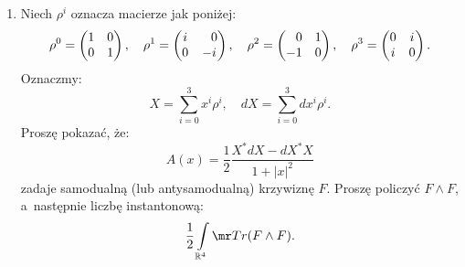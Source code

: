 \documentclass[a4paper,11pt]{article}
\begin{document}
\begin{enumerate}
\item Niech $\rho^{ i }$ oznacza macierze jak poniżej:
  \begin{equation}
    \label{eq:Superalgebra-05}
    \rho^{ 0 } =
    \begin{pmatrix}
      1 & 0 \\
      0 & 1
    \end{pmatrix}, \quad
    \rho^{ 1 } =
    \begin{pmatrix}
      i & \hphantom{-}0 \\
      0 & -i
    \end{pmatrix}, \quad
    \rho^{ 2 } =
    \begin{pmatrix}
      \hphantom{-}0 & 1 \\
      -1 & 0
    \end{pmatrix}, \quad
    \rho^{ 3 } =
    \begin{pmatrix}
      0 & i \\
      i & 0
    \end{pmatrix}.
  \end{equation}
  Oznaczmy:
  \begin{equation}
    \label{eq:Superalgebra-06}
    X = \sum_{ i = 0 }^{ 3 } x^{ i } \rho^{ i }, \quad
    dX = \sum_{ i = 0 }^{ 3 } dx^{ i } \rho^{ i }.
  \end{equation}
  Proszę pokazać, że:
  \begin{equation}
    \label{eq:Superalgebra-07}
    A( x ) =
    \frac{ 1 }{ 2 } \frac{ X^{ * } dX - dX^{ * } X}{ 1 + | x |^{ 2 } }
  \end{equation}
  zadaje samodualną (lub antysamodualną) krzywiznę $F$. Proszę policzyć
  $F \wedge F$, a~następnie liczbę instantonową:
  \begin{equation}
    \label{eq:Superalgebra-08}
    \frac{ 1 }{ 2 } \int\limits_{ \Rbb^{ 4 } } \Tr ( F \wedge F ).
  \end{equation}









\end{enumerate}
\end{document}
